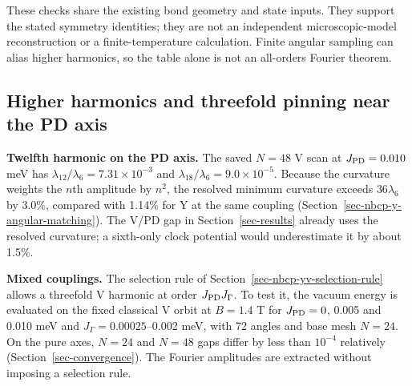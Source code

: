 These checks share the existing bond geometry and state inputs. They
support the stated symmetry identities; they are not an independent
microscopic-model reconstruction or a finite-temperature calculation.
Finite angular sampling can alias higher harmonics, so the table alone
is not an all-orders Fourier theorem.

\subsection{Higher harmonics and threefold pinning near the PD
axis}\label{sec-nbcp-v-mixed-soc}

\textbf{Twelfth harmonic on the PD axis.} The saved \(N=48\) V scan at
\(J_{\rm PD}=0.010\) meV has \(\lambda_{12}/\lambda_6=7.31\times10^{-3}\)
and \(\lambda_{18}/\lambda_6=9.0\times10^{-5}\). Because the curvature
weights the \(n\)th amplitude by \(n^2\), the resolved minimum curvature
exceeds \(36\lambda_6\) by 3.0\%, compared with 1.14\% for Y at the same
coupling (Section~\ref{sec-nbcp-y-angular-matching}). The V/PD gap in
Section~\ref{sec-results} already uses the resolved curvature; a
sixth-only clock potential would underestimate it by about 1.5\%.

\textbf{Mixed couplings.} The selection rule of
Section~\ref{sec-nbcp-yv-selection-rule} allows a threefold V harmonic at
order \(J_{\rm PD}J_\Gamma\). To test it, the vacuum energy is evaluated on
the fixed classical V orbit at \(B=1.4\) T for \(J_{\rm PD}=0\), 0.005 and
0.010 meV and \(J_\Gamma=0.00025\)--0.002 meV, with 72 angles and base
mesh \(N=24\). On the pure axes, \(N=24\) and \(N=48\) gaps differ by less
than \(10^{-4}\) relatively (Section~\ref{sec-convergence}). The Fourier
amplitudes are extracted without imposing a selection rule.

